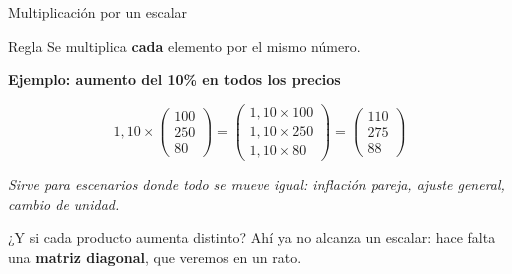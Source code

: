 \documentclass[aspectratio=169,10pt]{beamer}
\begin{document}
\begin{frame}{Multiplicación por un escalar}

\begin{block}{Regla}
Se multiplica \textbf{cada} elemento por el mismo número.
\end{block}

\vspace{0.3cm}
\textbf{Ejemplo: aumento del 10\% en todos los precios}

$$1{,}10 \times \begin{pmatrix} 100 \\ 250 \\ 80 \end{pmatrix}
= \begin{pmatrix} 1{,}10 \times 100 \\ 1{,}10 \times 250 \\ 1{,}10 \times 80 \end{pmatrix}
= \begin{pmatrix} 110 \\ 275 \\ 88 \end{pmatrix}$$

\vspace{0.4cm}
\begin{center}
\textit{Sirve para escenarios donde todo se mueve igual: inflación pareja, ajuste general, cambio de unidad.}
\end{center}

\vspace{0.3cm}
\begin{block}{¿Y si cada producto aumenta distinto?}
Ahí ya no alcanza un escalar: hace falta una \textbf{matriz diagonal}, que veremos en un rato.
\end{block}
\end{frame}
\end{document}
